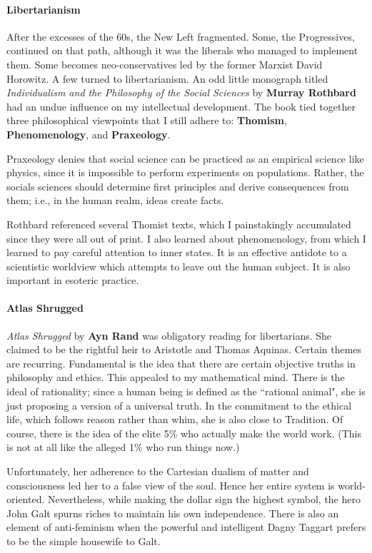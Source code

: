 \paragraph{Libertarianism}
After the excesses of the 60s, the New Left fragmented. Some, the Progressives, continued on that path, although it was the liberals who managed to implement them. Some becomes neo-conservatives led by the former Marxist David Horowitz. A few turned to libertarianism. An odd little monograph titled \emph{Individualism and the Philosophy of the Social Sciences} by \textbf{Murray Rothbard} had an undue influence on my intellectual development. The book tied together three philosophical viewpoints that I still adhere to: \textbf{Thomism}, \textbf{Phenomenology}, and \textbf{Praxeology}.

Praxeology denies that social science can be practiced as an empirical science like physics, since it is impossible to perform experiments on populations. Rather, the socials sciences should determine first principles and derive consequences from them; i.e., in the human realm, ideas create facts.

Rothbard referenced several Thomist texts, which I painstakingly accumulated since they were all out of print. I also learned about phenomenology, from which I learned to pay careful attention to inner states. It is an effective antidote to a scientistic worldview which attempts to leave out the human subject. It is also important in esoteric practice.

\paragraph{Atlas Shrugged}
\emph{Atlas Shrugged} by \textbf{Ayn Rand} was obligatory reading for libertarians. She claimed to be the rightful heir to Aristotle and Thomas Aquinas. Certain themes are recurring. Fundamental is the idea that there are certain objective truths in philosophy and ethics. This appealed to my mathematical mind. There is the ideal of rationality; since a human being is defined as the ``rational animal", she is just proposing a version of a universal truth. In the commitment to the ethical life, which follows reason rather than whim, she is also close to Tradition. Of course, there is the idea of the elite 5\% who actually make the world work. (This is not at all like the alleged 1\% who run things now.)

Unfortunately, her adherence to the Cartesian dualism of matter and consciousness led her to a false view of the soul. Hence her entire system is world-oriented. Nevertheless, while making the dollar sign the highest symbol, the hero John Galt spurns riches to maintain his own independence. There is also an element of anti-feminism when the powerful and intelligent Dagny Taggart prefers to be the simple housewife to Galt.

